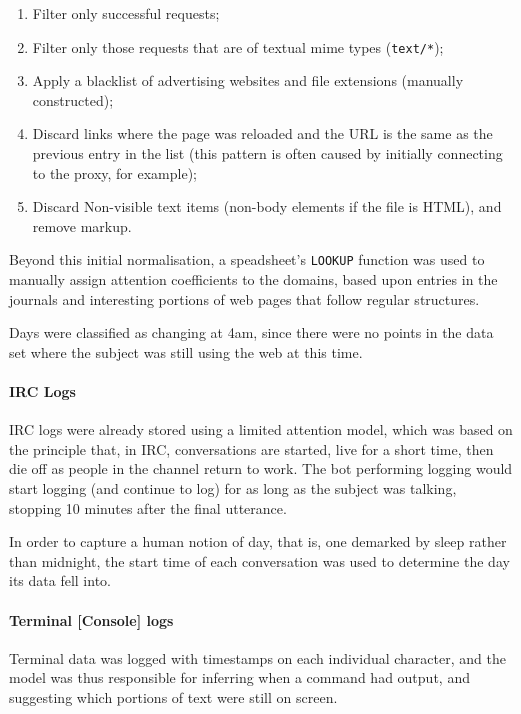 \begin{enumerate}
    \item Filter only successful requests;
    \item Filter only those requests that are of textual mime types (\texttt{text/*});
    \item Apply a blacklist of advertising websites and file extensions (manually constructed);
    \item Discard links where the page was reloaded and the URL is the same as the previous entry in the list (this pattern is often caused by initially connecting to the proxy, for example);
    \item Discard Non-visible text items (non-body elements if the file is HTML), and remove markup.
\end{enumerate}

Beyond this initial normalisation, a speadsheet's \texttt{LOOKUP} function was used to manually assign attention coefficients to the domains, based upon entries in the journals and interesting portions of web pages that follow regular structures.

Days were classified as changing at 4am, since there were no points in the data set where the subject was still using the web at this time.



\paragraph{IRC Logs}
IRC logs were already stored using a limited attention model, which was based on the principle that, in IRC, conversations are started, live for a short time, then die off as people in the channel return to work.  The bot performing logging would start logging (and continue to log) for as long as the subject was talking, stopping 10 minutes after the final utterance.

In order to capture a human notion of day, that is, one demarked by sleep rather than midnight, the start time of each conversation was used to determine the day its data fell into.



\paragraph{Terminal [Console] logs}
Terminal data was logged with timestamps on each individual character, and the model was thus responsible for inferring when a command had output, and suggesting which portions of text were still on screen.

